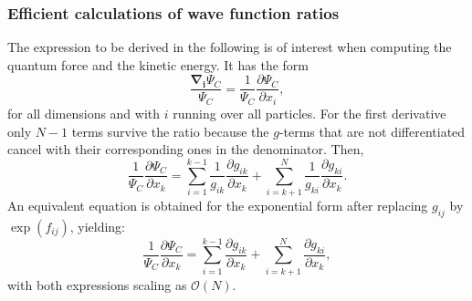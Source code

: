 \documentclass[compress]{beamer}
\newcommand{\bfv}[1]{\boldsymbol{#1}}                     %
\begin{document}
\frame
 {
   \frametitle{Efficient calculations of wave function ratios}
 \begin{small}
 {\scriptsize
The expression to be derived in the following is of interest when computing the quantum force and the kinetic energy. It has the form
$$
\frac{\bfv{{\nabla_i}}\Psi_C}{\Psi_C} = \frac{1}{\Psi_C}\frac{\partial \Psi_C}{\partial x_i},
$$
for all dimensions and with $i$ running over all particles.
For the first derivative only $N-1$ terms survive the ratio because the $g$-terms that are not differentiated cancel with their corresponding ones in the denominator. Then,
\begin{equation}\label{1jgradG}
\frac{1}{\Psi_C}\frac{\partial \Psi_C}{\partial x_k} =
\sum_{i=1}^{k-1}\frac{1}{g_{ik}}\frac{\partial g_{ik}}{\partial x_k}
+
\sum_{i=k+1}^{N}\frac{1}{g_{ki}}\frac{\partial g_{ki}}{\partial x_k}.
\end{equation}
An equivalent equation is obtained for the exponential form after replacing $g_{ij}$ by $\exp(f_{ij})$, yielding:
\begin{equation}\label{1jgradEG}
\frac{1}{\Psi_C}\frac{\partial \Psi_C}{\partial x_k} =
\sum_{i=1}^{k-1}\frac{\partial g_{ik}}{\partial x_k}
+
\sum_{i=k+1}^{N}\frac{\partial g_{ki}}{\partial x_k},
\end{equation}
with both expressions scaling as $\mathcal{O}(N)$.
 }
 \end{small}
 }
\end{document}
